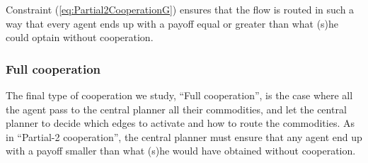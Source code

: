 \documentclass[review]{elsarticle}
\begin{document}
Constraint (\ref{eq:Partial2CooperationG}) ensures that the flow is routed in such a way that every agent ends up with a payoff equal or greater than what (s)he could
optain without cooperation.

\subsubsection*{Full cooperation}


The final type of cooperation we study, ``Full cooperation'', is the case where all the agent pass to the central planner all their commodities,
and let the central planner to decide which edges to activate and how to route the commodities.
As in ``Partial-2 cooperation'', the central planner must ensure that any agent end up with a payoff
smaller than what (s)he would have obtained without cooperation.
\end{document}
